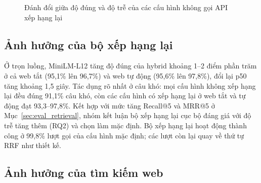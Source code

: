 \begin{figure}[H]
\centering
{}
\caption{Đánh đổi giữa độ đúng và độ trễ của các cấu hình không gọi API xếp hạng lại}
\label{fig:ablation_scatter}
\end{figure}

\subsection{Ảnh hưởng của bộ xếp hạng lại}
\label{sec:ablation_rerank}

Ở trọn luồng, MiniLM-L12 tăng độ đúng của hybrid khoảng 1--2 điểm phần trăm ở cả web tắt (95,1\% lên 96,7\%) và web tự động (95,6\% lên 97,8\%), đổi lại p50 tăng khoảng 1,5 giây. Tác dụng rõ nhất ở câu khó: mọi cấu hình không xếp hạng lại đều đúng 91,1\% câu khó, còn các cấu hình có xếp hạng lại ở web tắt và tự động đạt 93,3--97,8\%. Kết hợp với mức tăng Recall@5 và MRR@5 ở Mục~\ref{sec:eval_retrieval}, nhóm kết luận bộ xếp hạng lại cục bộ đáng giá với độ trễ tăng thêm (RQ2) và chọn làm mặc định. Bộ xếp hạng lại hoạt động thành công ở 99,8\% lượt gọi của cấu hình mặc định; các lượt còn lại quay về thứ tự RRF như thiết kế.

\subsection{Ảnh hưởng của tìm kiếm web}
\label{sec:ablation_web}


